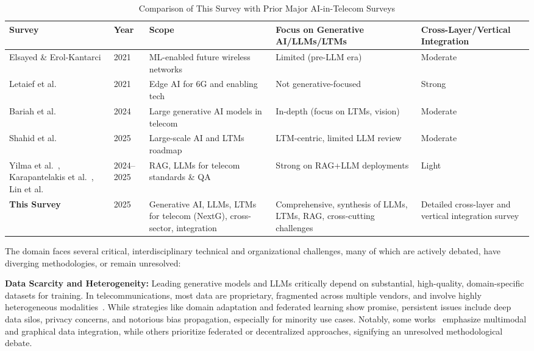 \documentclass[sigconf]{acmart}
\begin{document}
\begin{table*}[htbp]
\centering
\caption{Comparison of This Survey with Prior Major AI-in-Telecom Surveys}
\label{tab:survey-comparison}
\begin{adjustbox}{max width=\textwidth}
\begin{tabular}{@{}lllll@{}}
\toprule
\textbf{Survey} & \textbf{Year} & \textbf{Scope} & \textbf{Focus on Generative AI/LLMs/LTMs} & \textbf{Cross-Layer/Vertical Integration} \\
\midrule
Elsayed \& Erol-Kantarci~\cite{ref46} & 2021 & ML-enabled future wireless networks & Limited (pre-LLM era) & Moderate \\
Letaief et al.~\cite{ref49} & 2021 & Edge AI for 6G and enabling tech & Not generative-focused & Strong \\
Bariah et al.~\cite{ref26} & 2024 & Large generative AI models in telecom & In-depth (focus on LTMs, vision) & Moderate \\
Shahid et al.~\cite{ref33} & 2025 & Large-scale AI and LTMs roadmap & LTM-centric, limited LLM review & Moderate \\
Yilma et al.~\cite{ref20}, Karapantelakis et al.~\cite{ref22}, Lin et al.~\cite{ref34} & 2024--2025 & RAG, LLMs for telecom standards \& QA & Strong on RAG+LLM deployments & Light \\
\textbf{This Survey} & 2025 & Generative AI, LLMs, LTMs for telecom (NextG), cross-sector, integration & Comprehensive, synthesis of LLMs, LTMs, RAG, cross-cutting challenges & Detailed cross-layer and vertical integration survey \\
\bottomrule
\end{tabular}
\end{adjustbox}
\end{table*}

The domain faces several critical, interdisciplinary technical and organizational challenges, many of which are actively debated, have diverging methodologies, or remain unresolved:

\textbf{Data Scarcity and Heterogeneity:} Leading generative models and LLMs critically depend on substantial, high-quality, domain-specific datasets for training. In telecommunications, most data are proprietary, fragmented across multiple vendors, and involve highly heterogeneous modalities~\cite{ref21, ref46}. While strategies like domain adaptation and federated learning show promise, persistent issues include deep data silos, privacy concerns, and notorious bias propagation, especially for minority use cases. Notably, some works~\cite{ref21, ref22, ref46} emphasize multimodal and graphical data integration, while others prioritize federated or decentralized approaches, signifying an unresolved methodological debate.
\end{document}
